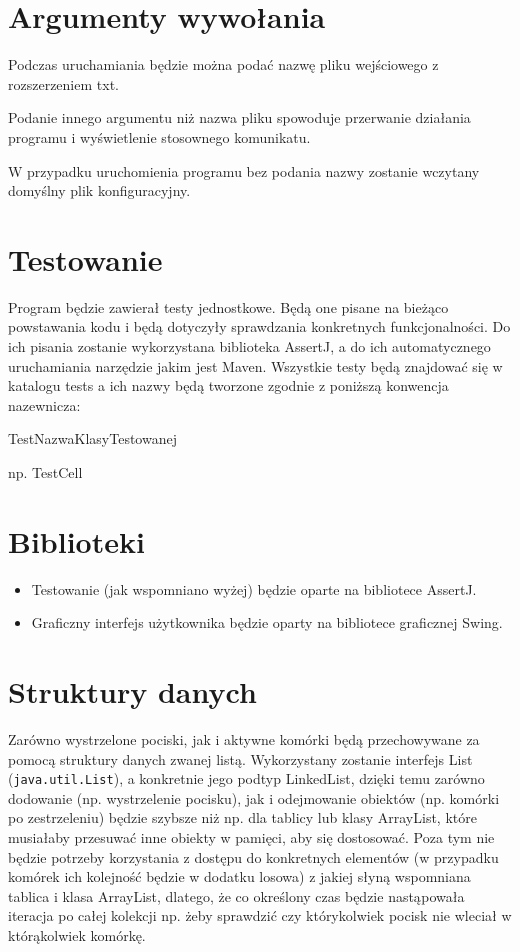 \documentclass{article}
\begin{document}
\newpage

\section{Argumenty wywołania}


Podczas uruchamiania będzie można podać nazwę pliku wejściowego z rozszerzeniem txt.

Podanie innego argumentu niż nazwa pliku spowoduje przerwanie działania programu i wyświetlenie stosownego komunikatu.

W przypadku uruchomienia programu bez podania nazwy zostanie wczytany domyślny plik konfiguracyjny.
\section{Testowanie}

Program będzie zawierał testy jednostkowe. Będą one pisane na bieżąco powstawania kodu i będą dotyczyły sprawdzania konkretnych funkcjonalności. Do ich pisania zostanie wykorzystana biblioteka AssertJ, a do ich automatycznego uruchamiania narzędzie jakim jest Maven. Wszystkie testy będą znajdować się w katalogu tests a ich nazwy będą tworzone zgodnie z poniższą konwencja nazewnicza:

TestNazwaKlasyTestowanej

np. TestCell


\section{Biblioteki}
\begin{itemize}
    \item Testowanie (jak wspomniano wyżej) będzie oparte na bibliotece AssertJ. 

    \item Graficzny interfejs użytkownika będzie oparty na bibliotece graficznej Swing.
\end{itemize}


\section{Struktury danych}

Zarówno wystrzelone pociski, jak i aktywne komórki będą przechowywane za pomocą struktury danych zwanej listą. Wykorzystany zostanie interfejs List (\texttt{java.util.List}), a konkretnie jego podtyp LinkedList, dzięki temu zarówno dodowanie (np. wystrzelenie pocisku), jak i odejmowanie obiektów (np. komórki po zestrzeleniu) będzie szybsze niż np. dla tablicy lub klasy ArrayList, które musiałaby przesuwać inne obiekty w pamięci, aby się dostosować. Poza tym nie będzie potrzeby korzystania z dostępu do konkretnych elementów (w przypadku komórek ich kolejność będzie w dodatku losowa) z jakiej słyną wspomniana tablica i klasa ArrayList, dlatego, że co określony czas będzie nastąpowała iteracja po całej kolekcji np. żeby sprawdzić czy którykolwiek pocisk nie wleciał w którąkolwiek komórkę.
\end{document}
